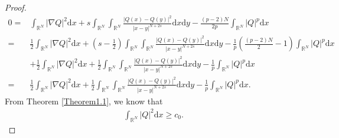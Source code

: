 \documentclass[10pt,a4paper]{amsart}
\begin{document}
\begin{proof}
\begin{equation*}
\begin{aligned}
0=&
\int_{\mathbb{R}^{N}}
|\nabla Q|^{2}
\mathrm{d}x
+s
\int_{\mathbb{R}^{N}}
\int_{\mathbb{R}^{N}}
\frac{|Q(x)-Q(y)|^{2}}{|x-y|^{N+2s}}
\mathrm{d}x
\mathrm{d}y
-\frac{(p-2)N}{2p}
\int_{\mathbb{R}^{N}}
|Q|^{p}
\mathrm{d}x\\
=&\frac{1}{2}
\int_{\mathbb{R}^{N}}
|\nabla Q|^{2}
\mathrm{d}x
+(s-\frac{1}{2})
\int_{\mathbb{R}^{N}}
\int_{\mathbb{R}^{N}}
\frac{|Q(x)-Q(y)|^{2}}{|x-y|^{N+2s}}
\mathrm{d}x
\mathrm{d}y
-\frac{1}{p}
(\frac{(p-2)N}{2}-1)
\int_{\mathbb{R}^{N}}
|Q|^{p}
\mathrm{d}x\\
&+\frac{1}{2}
\int_{\mathbb{R}^{N}}
|\nabla Q|^{2}
\mathrm{d}x
+\frac{1}{2}
\int_{\mathbb{R}^{N}}
\int_{\mathbb{R}^{N}}
\frac{|Q(x)-Q(y)|^{2}}{|x-y|^{N+2s}}
\mathrm{d}x
\mathrm{d}y
-\frac{1}{p}
\int_{\mathbb{R}^{N}}
|Q|^{p}
\mathrm{d}x\\
=&\frac{1}{2}
\int_{\mathbb{R}^{N}}
|\nabla Q|^{2}
\mathrm{d}x
+\frac{1}{2}
\int_{\mathbb{R}^{N}}
\int_{\mathbb{R}^{N}}
\frac{|Q(x)-Q(y)|^{2}}{|x-y|^{N+2s}}
\mathrm{d}x
\mathrm{d}y
-\frac{1}{p}
\int_{\mathbb{R}^{N}}
|Q|^{p}
\mathrm{d}x.
\end{aligned}
\end{equation*}
From Theorem \ref{Theorem1.1},
we know that
\begin{equation*}
\begin{aligned}
\int_{\mathbb{R}^{N}}
|Q|^{2}
\mathrm{d}x\geqslant c_{0}.
\end{aligned}
\end{equation*}
\end{proof}
\end{document}
